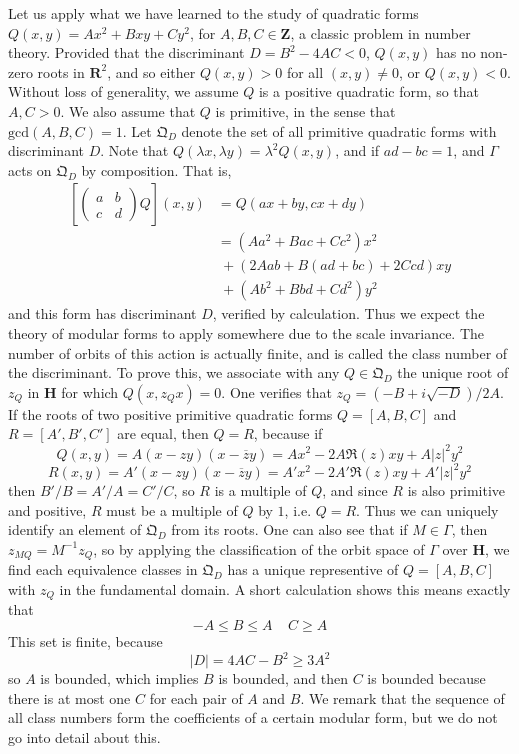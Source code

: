 Let us apply what we have learned to the study of quadratic forms $Q(x,y) = Ax^2 + Bxy + Cy^2$, for $A,B,C \in \mathbf{Z}$, a classic problem in number theory. Provided that the discriminant $D = B^2 - 4AC < 0$, $Q(x,y)$ has no non-zero roots in $\mathbf{R}^2$, and so either $Q(x,y) > 0$ for all $(x,y) \neq 0$, or $Q(x,y) < 0$. Without loss of generality, we assume $Q$ is a positive quadratic form, so that $A, C > 0$. We also assume that $Q$ is primitive, in the sense that $\text{gcd}(A,B,C) = 1$. Let $\mathfrak{Q}_D$ denote the set of all primitive quadratic forms with discriminant $D$. Note that $Q(\lambda x, \lambda y) = \lambda^2 Q(x,y)$, and if $ad - bc = 1$, and $\Gamma$ acts on $\mathfrak{Q}_D$ by composition. That is,
%
\begin{align*}
    \left[ \begin{pmatrix} a & b \\ c & d \end{pmatrix} Q \right] (x,y) &= Q(ax + by, cx + dy)\\
    &= (Aa^2 + Bac + Cc^2) x^2\\
    &\ + (2Aab + B(ad + bc) + 2Ccd) xy\\
    &\ + (Ab^2 + Bbd + Cd^2) y^2
\end{align*}
%
and this form has discriminant $D$, verified by calculation. Thus we expect the theory of modular forms to apply somewhere due to the scale invariance. The number of orbits of this action is actually finite, and is called the class number of the discriminant. To prove this, we associate with any $Q \in \mathfrak{Q}_D$ the unique root of $z_Q$ in $\mathbf{H}$ for which $Q(x,z_Q x) = 0$. One verifies that $z_Q = (-B + i\sqrt{-D})/2A$. If the roots of two positive primitive quadratic forms $Q = [A,B,C]$ and $R = [A',B',C']$ are equal, then $Q = R$, because if
%
\[ Q(x,y) = A (x - z y)(x - \overline{z} y) = Ax^2 - 2 A\Re(z) xy + A|z|^2 y^2 \]
\[ R(x,y) = A' (x - z y)(x - \overline{z} y) = A'x^2 - 2A'\Re(z) xy + A'|z|^2 y^2 \]
%
then $B'/B = A'/A = C'/C$, so $R$ is a multiple of $Q$, and since $R$ is also primitive and positive, $R$ must be a multiple of $Q$ by $1$, i.e. $Q = R$. Thus we can uniquely identify an element of $\mathfrak{Q}_D$ from its roots. One can also see that if $M \in \Gamma$, then $z_{MQ} = M^{-1}z_Q$, so by applying the classification of the orbit space of $\Gamma$ over $\mathbf{H}$, we find each equivalence classes in $\mathfrak{Q}_D$ has a unique representive of $Q = [A,B,C]$ with $z_Q$ in the fundamental domain. A short calculation shows this means exactly that
%
\[ -A \leq B \leq A\ \ \ \ \ C \geq A \]
%
This set is finite, because
%
\[ |D| = 4AC - B^2 \geq 3A^2 \]
%
so $A$ is bounded, which implies $B$ is bounded, and then $C$ is bounded because there is at most one $C$ for each pair of $A$ and $B$. We remark that the sequence of all class numbers form the coefficients of a certain modular form, but we do not go into detail about this.

